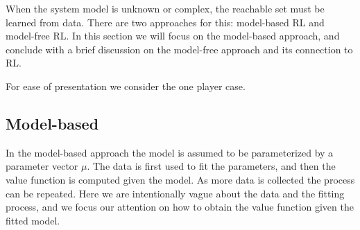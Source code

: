 
When the system model is unknown or complex, the reachable set must be learned from data. There are two approaches for this: model-based RL and model-free RL. In this section we will focus on the model-based approach, and conclude with a brief discussion on the model-free approach and its connection to RL.

For ease of presentation we consider the one player case.

\subsection{Model-based} \label{sec:model_based}

In the model-based approach the model is assumed to be parameterized by a parameter vector $\mu$. %
%
The data is first used to fit the parameters, and then the value function is computed given the model. As more data is collected the process can be repeated. Here we are intentionally vague about the data and the fitting process, and we focus our attention on how to obtain the value function given the fitted model.

